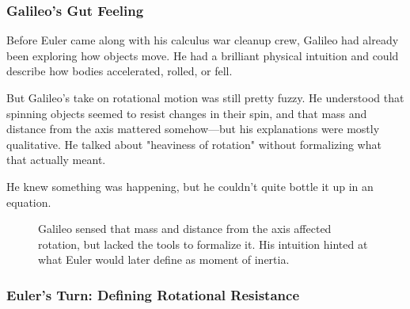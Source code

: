 \subsubsection{Galileo’s Gut Feeling}

Before Euler came along with his calculus war cleanup crew, Galileo had already been exploring how objects move. He had a brilliant physical intuition and could describe how bodies accelerated, rolled, or fell. 

But Galileo's take on rotational motion was still pretty fuzzy. He understood that spinning objects seemed to resist changes in their spin, and that mass and distance from the axis mattered somehow—but his explanations were mostly qualitative. He talked about "heaviness of rotation" without formalizing what that actually meant.

He knew something was happening, but he couldn’t quite bottle it up in an equation.


\begin{figure}[H]
\centering
{}
\caption{Galileo sensed that mass and distance from the axis affected rotation, but lacked the tools to formalize it. His intuition hinted at what Euler would later define as moment of inertia.}
\end{figure}



\subsubsection{Euler’s Turn: Defining Rotational Resistance}

